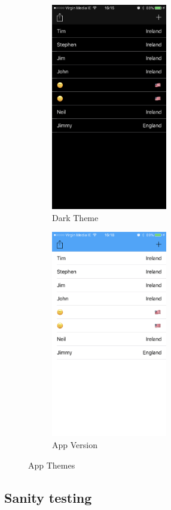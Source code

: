 \begin{figure}[!h]
    \begin{subfigure}{0.5\textwidth}
        \includegraphics[width=0.8\linewidth, height=9cm]{images/testing/darkTheme}
        \caption{Dark Theme}
        \label{fig:dark-theme}
    \end{subfigure}
    \begin{subfigure}{0.5\textwidth}
        \includegraphics[width=0.8\linewidth, height=9cm]{images/testing/lightTheme}
        \caption{App Version}
        \label{fig:light-theme}
    \end{subfigure}
\caption{App Themes}
\label{fig:app-themes}
\end{figure}


\subsection{Sanity testing}

